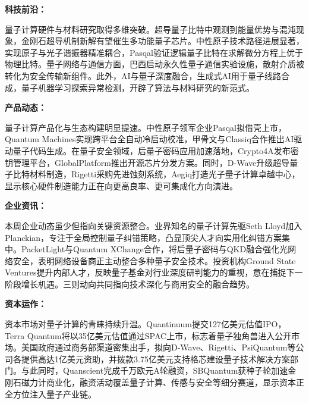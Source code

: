\documentclass[12pt,a4paper]{ctexart}
\begin{document}
\textbf{ 科技前沿：}

量子计算硬件与材料研究取得多维突破。超导量子比特中观测到能量优势与混沌现象，金刚石超导机制新解有望催生多功能量子芯片。中性原子技术路径进展显著，实现原子与光子谐振器精准耦合，Pasqal验证逻辑量子比特在求解微分方程上优于物理比特。量子网络与通信方面，巴西启动永久性量子通信实验设施，散射介质被转化为安全传输新组件。此外，AI与量子深度融合，生成式AI用于量子线路合成，量子机器学习探索异常检测，开辟了算法与材料研究的新范式。


\textbf{ 产品动态：}

量子计算产品化与生态构建明显提速。中性原子领军企业Pasqal拟借壳上市，Quantum Machines实现跨平台全自动冷启动校准，甲骨文与Classiq合作推出AI驱动量子代码生成。在量子安全领域，后量子密码应用加速落地，Crypto4A发布密钥管理平台，GlobalPlatform推出开源芯片分发方案。同时，D-Wave升级超导量子比特材料制造，Rigetti采购先进蚀刻系统，Aegiq打造光子量子计算卓越中心，显示核心硬件制造能力正在向更高良率、更可集成化方向演进。


\textbf{ 企业资讯：}

本周企业动态虽少但指向关键资源整合。业界知名的量子计算先驱Seth Lloyd加入Planckian，专注于全局控制量子纠错策略，凸显顶尖人才向实用化纠错方案集中。PacketLight与Quantum XChange合作，将后量子密码与QKD融合强化光网络安全，表明网络设备商正主动整合多种量子安全技术。投资机构Ground State Ventures提升内部人才，反映量子基金对行业深度研判能力的重视，意在捕捉下一阶段增长机遇。三则动向共同指向技术深化与商用安全的融合趋势。


\textbf{ 资本运作：}

资本市场对量子计算的青睐持续升温。Quantinuum提交127亿美元估值IPO，Terra Quantum将以35亿美元估值通过SPAC上市，标志着量子独角兽进入公开市场。美国政府通过商务部渠道密集出手，拟向D-Wave、Rigetti、PsiQuantum等公司各提供高达1亿美元资助，并拨款3.75亿美元支持格芯建设量子技术解决方案部门。与此同时，Quanscient完成千万欧元A轮融资，SBQuantum获种子轮加速金刚石磁力计商业化，融资活动覆盖量子计算、传感与安全等细分赛道，显示资本正全方位注入量子产业链。
\end{document}
